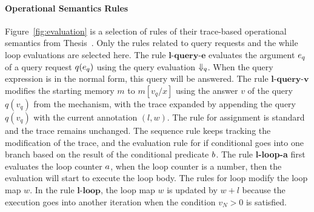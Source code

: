  \paragraph{Operational Semantics Rules}
Figure~\ref{fig:evaluation} is a selection of rules of their trace-based operational semantics from {Thesis~\cite{weihao22}}.
Only the rules related to query requests and the while loop evaluations are selected here.
The rule $\textbf{l-query-e}$ evaluates the argument $e_q$ of a query request $q(e_q)$ using the query evaluation $\Downarrow_q$.
When the query expression is in the normal form, this query will be answered.
The rule $\textbf{l-query-v}$ modifies the starting memory $m$ to $m[v_q/x]$ using the answer $v$ of the query $q(v_q)$ from the mechanism, with the trace expanded by appending the query $q(v_q)$ with the current annotation $(l,w)$.
The rule for assignment is standard and the trace remains unchanged.
The sequence rule keeps tracking the modification of the trace, and the evaluation rule for if conditional goes into one branch based on the result of the conditional predicate $b$. 
The rule \textbf{l-loop-a} first evaluates the loop counter $a$, when the loop counter is a number, then the evaluation will start to execute the loop body.
The rules for loop modify the loop map $w$. In the rule $\textbf{l-loop}$, the loop map $w$ is updated by $w + l$ because the execution goes into another iteration when the condition $v_N >0$ is satisfied.
% 
